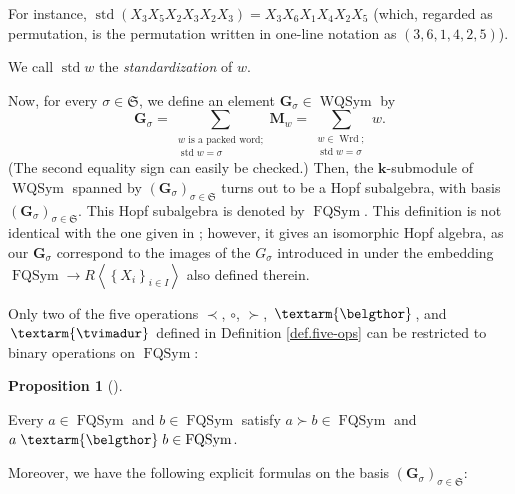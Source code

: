 \documentclass[numbers=enddot,12pt,final,onecolumn,notitlepage,abstracton]{scrartcl}%
\theoremstyle{definition}
\newtheorem{prop}[theo]{Proposition}
\newenvironment{proposition}[1][]
{\begin{prop}[#1]\begin{leftbar}}
{\end{leftbar}\end{prop}}
\newcommand{\tvi}{\left. \textarm{\tvimadur} \right.}
\newcommand{\bel}{\left. \textarm{\belgthor} \right.}
\let\sumnonlimits\sum
\renewcommand{\sum}{\sumnonlimits\limits}
\begin{document}
For instance, $\operatorname*{std}\left(  X_{3}X_{5}X_{2}X_{3}X_{2}%
X_{3}\right)  =X_{3}X_{6}X_{1}X_{4}X_{2}X_{5}$ (which, regarded as
permutation, is the permutation written in one-line notation as $\left(
3,6,1,4,2,5\right)  $).

We call $\operatorname*{std}w$ the \textit{standardization} of $w$.

Now, for every $\sigma\in\mathfrak{S}$, we define an element $\mathbf{G}%
_{\sigma}\in\operatorname*{WQSym}$ by%
\[
\mathbf{G}_{\sigma}=\sum_{\substack{w\text{ is a packed word;}%
\\\operatorname*{std}w=\sigma}}\mathbf{M}_{w}=\sum_{\substack{w\in
\operatorname*{Wrd};\\\operatorname*{std}w=\sigma}}w.
\]
(The second equality sign can easily be checked.) Then, the $\mathbf{k}%
$-submodule of $\operatorname*{WQSym}$ spanned by $\left(  \mathbf{G}_{\sigma
}\right)  _{\sigma\in\mathfrak{S}}$ turns out to be a Hopf subalgebra, with
basis $\left(  \mathbf{G}_{\sigma}\right)  _{\sigma\in\mathfrak{S}}$. This
Hopf subalgebra is denoted by $\operatorname*{FQSym}$. This definition is not
identical with the one given in \cite[Section 8.1]{Reiner}; however, it gives
an isomorphic Hopf algebra, as our $\mathbf{G}_{\sigma}$ correspond to the
images of the $G_{\sigma}$ introduced in \cite[Section 8.1]{Reiner} under the
embedding $\operatorname*{FQSym}\rightarrow R\left\langle \left\{
X_{i}\right\}  _{i\in I}\right\rangle $ also defined therein.

Only two of the five operations $\left.  \prec\right.  $, $\circ$, $\left.
\succ\right.  $, $\bel $, and $\tvi $ defined in Definition \ref{def.five-ops}
can be restricted to binary operations on $\operatorname*{FQSym}$:

\begin{proposition}
\label{prop.FQSym.closed}Every $a\in\operatorname*{FQSym}$ and $b\in
\operatorname*{FQSym}$ satisfy $a\left.  \succ\right.  b\in
\operatorname*{FQSym}$ and $a \bel b\in\operatorname*{FQSym}$.
\end{proposition}

Moreover, we have the following explicit formulas on the basis $\left(
\mathbf{G}_{\sigma}\right)  _{\sigma\in\mathfrak{S}}$:
\end{document}
